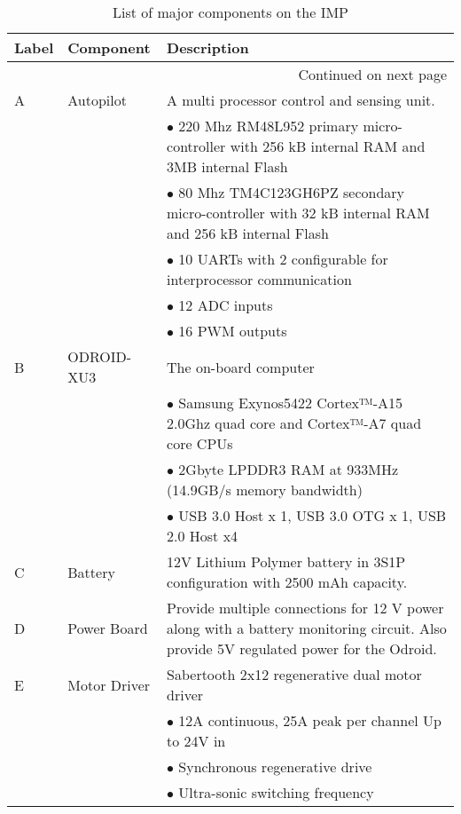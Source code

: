 \begin{longtable}{| l | p{3cm} | p{10cm} |}
		\caption{List of major components on the IMP}
		\label{tab: Components}\\

 		\hline
 		Label & Component & Description \\ \hline 
 		\endhead
 		
 		\hline \multicolumn{3}{|r|}{{Continued on next page}} \\ \hline
 		\endfoot
 		
 		\hline \hline
 		\endlastfoot
 		
 		A & Autopilot & A multi processor control and sensing unit. 
	 		\\ & & $ \bullet $ 220 Mhz RM48L952 primary micro-controller with 256 kB internal RAM and 3MB internal Flash 
	 		\\ & & $ \bullet $ 80 Mhz TM4C123GH6PZ secondary micro-controller with 32 kB internal RAM and 256 kB internal Flash 
	 		\\ & & $ \bullet $ 10 UARTs with 2 configurable for interprocessor communication 
	 		\\ & & $ \bullet $ 12 ADC inputs 
	 		\\ & & $ \bullet $ 16 PWM outputs	
 		\\ \hline
		B & ODROID-XU3 & The on-board computer
			\\ & & $ \bullet $ Samsung Exynos5422 Cortex™-A15 2.0Ghz quad core and Cortex™-A7 quad core CPUs
	 		\\ & & $ \bullet $ 2Gbyte LPDDR3 RAM at 933MHz (14.9GB/s memory bandwidth)
	 		\\ & & $ \bullet $ USB 3.0 Host x 1, USB 3.0 OTG x 1, USB 2.0 Host x4  
 		\\ \hline
 		C & Battery & 12V Lithium Polymer battery in 3S1P configuration with 2500 mAh capacity.
 		\\ \hline
 		D & Power Board & Provide multiple connections for 12 V power along with a battery monitoring circuit. Also provide 5V regulated power for the Odroid. 
 		\\ \hline
 		E & Motor Driver & Sabertooth 2x12 regenerative dual motor driver
			\\ & & $ \bullet $ 12A continuous, 25A peak per channel
			Up to 24V in
	 		\\ & & $ \bullet $ Synchronous regenerative drive
	 		\\ & & $ \bullet $ Ultra-sonic switching frequency

\end{longtable}
